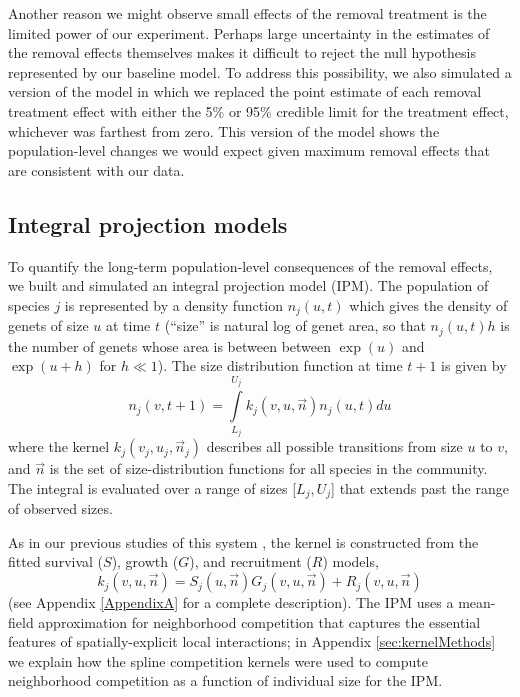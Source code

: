 \documentclass[11pt]{article}
\begin{document}
\begin{doublespacing}
Another reason we might observe small effects of the removal treatment is the limited power of our experiment. Perhaps large uncertainty in the estimates of the removal effects themselves makes it difficult to reject the null hypothesis represented by our baseline model. To address this possibility, we also simulated a version of the model in which we replaced the point estimate of each removal treatment effect with either the 5\% or 95\% credible limit for the treatment effect, whichever was farthest from zero. This version of the model shows the population-level changes we would expect given maximum removal effects that are consistent with our data.

\subsection*{Integral projection models}

To quantify the long-term population-level consequences of the removal effects, we built and simulated an integral projection model (IPM). The population 
of species $j$ is represented by a density function $n_j(u,t)$ which gives the density of genets of size $u$ at time $t$ (``size'' is natural log of genet area, so 
that $n_j(u,t)h$ is the number of genets whose area is between between $\exp(u)$ and $\exp(u+h)$ for $h \ll 1$). The size distribution function at time $t+1$ is given by
\begin{equation}
n_j(v,t+1)=\int\limits_{L_j}^{U_j} k_j (v,u,{\vec{n}})n_j(u,t)du   
\label{eqn:IPM}
\end{equation}
where the kernel $k_j (v_j,u_j,\vec{n}_j)$ describes all possible transitions from size $u$ to $v$, and $\vec{n}$ 
is the set of size-distribution functions for all species in the community. The integral is evaluated over a range of sizes [$L_j,U_j$] 
that extends past the range of observed sizes.  

As in our previous studies of this system \citep{adler_coexistence_2010,adler_forecasting_2012}, the kernel is constructed from the fitted survival ($S$), growth ($G$), and recruitment ($R$) models, 
\begin{equation}
k_j(v,u,\vec{n})=S_j(u,\vec{n})G_j(v,u,\vec{n})+R_j(v,u,\vec{n}) 
\label{eqn:IPM} 
\end{equation}
(see Appendix \ref{AppendixA} for a complete description). The IPM uses a mean-field approximation for
neighborhood competition that captures the essential features of spatially-explicit local interactions; 
in Appendix \ref{sec:kernelMethods} we explain how the spline competition kernels were used 
to compute neighborhood competition as a function of individual size for the IPM.  


\end{doublespacing}
\end{document}
